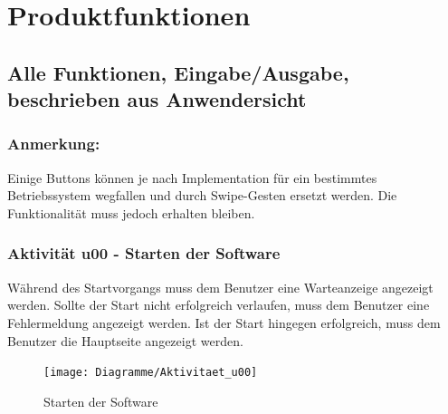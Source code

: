 \documentclass[a4paper,12pt,oneside]{scrartcl}
\begin{document}
\section{Produktfunktionen}
\subsection{Alle Funktionen, Eingabe/Ausgabe, beschrieben aus Anwendersicht}

\subsubsection*{Anmerkung:}
Einige Buttons können je nach Implementation für ein bestimmtes Betriebssystem wegfallen und durch Swipe-Gesten ersetzt werden. Die Funktionalität muss jedoch erhalten bleiben.


\subsubsection{Aktivität u00 - Starten der Software}
Während des Startvorgangs muss dem Benutzer eine Warteanzeige angezeigt werden. Sollte der Start nicht erfolgreich verlaufen, muss dem Benutzer eine Fehlermeldung angezeigt werden. Ist der Start hingegen erfolgreich, muss dem Benutzer die Hauptseite angezeigt werden.

\begin{figure}[!htbp]
\centering
\noindent\texttt{[image: Diagramme/Aktivitaet\_u00]}
\caption{Starten der Software}
\end{figure}
\FloatBarrier
\end{document}
